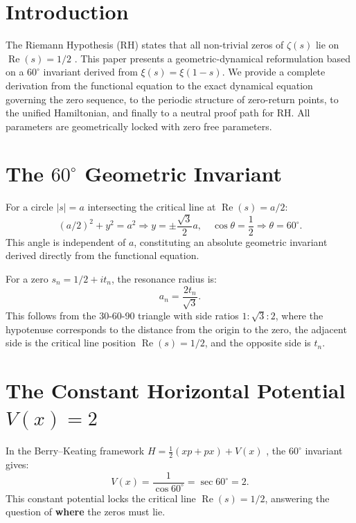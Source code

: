 \documentclass[12pt,a4paper]{article}
\begin{document}
\section{Introduction}

The Riemann Hypothesis (RH) states that all non-trivial zeros of $\zeta(s)$ lie on $\operatorname{Re}(s)=1/2$ \cite{riemann}. 
This paper presents a geometric-dynamical reformulation based on a $60^\circ$ invariant derived from $\xi(s)=\xi(1-s)$.
We provide a complete derivation from the functional equation to the exact dynamical equation governing the zero sequence, to the periodic structure of zero-return points, to the unified Hamiltonian, and finally to a neutral proof path for RH. All parameters are geometrically locked with zero free parameters.

\section{The $60^\circ$ Geometric Invariant}

For a circle $|s|=a$ intersecting the critical line at $\operatorname{Re}(s)=a/2$:
\begin{equation}
(a/2)^2 + y^2 = a^2 \Longrightarrow y = \pm \frac{\sqrt{3}}{2}a, \quad \cos\theta = \frac{1}{2} \Longrightarrow \theta = 60^\circ.
\end{equation}
This angle is independent of $a$, constituting an absolute geometric invariant derived directly from the functional equation.

For a zero $s_n = 1/2 + i t_n$, the resonance radius is:
\begin{equation}
a_n = \frac{2t_n}{\sqrt{3}}.
\end{equation}
This follows from the 30-60-90 triangle with side ratios $1 : \sqrt{3} : 2$, where the hypotenuse corresponds to the distance from the origin to the zero, the adjacent side is the critical line position $\operatorname{Re}(s)=1/2$, and the opposite side is $t_n$.

\section{The Constant Horizontal Potential $V(x)=2$}

In the Berry--Keating framework $H = \frac{1}{2}(xp+px) + V(x)$ \cite{berry-keating}, the $60^\circ$ invariant gives:
\begin{equation}
V(x) = \frac{1}{\cos 60^\circ} = \sec 60^\circ = 2.
\end{equation}
This constant potential locks the critical line $\operatorname{Re}(s)=1/2$, answering the question of \textbf{where} the zeros must lie.
\end{document}
